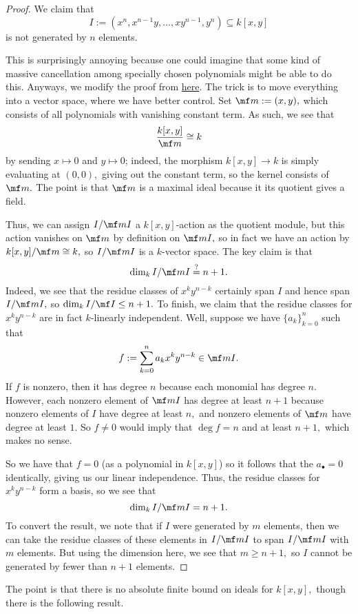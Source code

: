 \begin{proof}
	We claim that
	\[I:=\left(x^n,x^{n-1}y,\ldots,xy^{n-1},y^n\right)\subseteq k[x,y]\]
	is not generated by $n$ elements.
	
	This is surprisingly annoying because one could imagine that some kind of massive cancellation among specially chosen polynomials might be able to do this. Anyways, we modify the proof from \href{https://math.stackexchange.com/a/1622173/869257}{here}. The trick is to move everything into a vector space, where we have better control. Set $\mf m:=(x,y),$ which consists of all polynomials with vanishing constant term. As such, we see that
	\[\frac{k[x,y]}{\mf m}\cong k\]
	by sending $x\mapsto0$ and $y\mapsto0$; indeed, the morphism $k[x,y]\to k$ is simply evaluating at $(0,0),$ giving out the constant term, so the kernel consists of $\mf m.$ The point is that $\mf m$ is a maximal ideal because it its quotient gives a field.

	Thus, we can assign $I/\mf mI$ a $k[x,y]$-action as the quotient module, but this action vanishes on $\mf m$ by definition on $\mf mI,$ so in fact we have an action by $k[x,y]/\mf m\cong k,$ so $I/\mf mI$ is a $k$-vector space. The key claim is that
	\[\dim_kI/\mf mI\stackrel?=n+1.\]
	Indeed, we see that the residue classes of $x^ky^{n-k}$ certainly span $I$ and hence span $I/\mf mI,$ so $\dim_kI/\mf I\le n+1.$ To finish, we claim that the residue classes for $x^ky^{n-k}$ are in fact $k$-linearly independent. Well, suppose we have $\{a_k\}_{k=0}^n$ such that
	\[f:=\sum_{k=0}^na_kx^ky^{n-k}\in\mf mI.\]
	If $f$ is nonzero, then it has degree $n$ because each monomial has degree $n.$ However, each nonzero element of $\mf mI$ has degree at least $n+1$ because nonzero elements of $I$ have degree at least $n,$ and nonzero elements of $\mf m$ have degree at least $1.$ So $f\ne0$ would imply that $\deg f=n$ and at least $n+1,$ which makes no sense.

	So we have that $f=0$ (as a polynomial in $k[x,y]$) so it follows that the $a_\bullet=0$ identically, giving us our linear independence. Thus, the residue classes for $x^ky^{n-k}$ form a basis, so we see that
	\[\dim_kI/\mf mI=n+1.\]
	To convert the result, we note that if $I$ were generated by $m$ elements, then we can take the residue classes of these elements in $I/\mf mI$ to span $I/\mf mI$ with $m$ elements. But using the dimension here, we see that $m\ge n+1,$ so $I$ cannot be generated by fewer than $n+1$ elements.
\end{proof}
The point is that there is no absolute finite bound on ideals for $k[x,y],$ though there is the following result.
